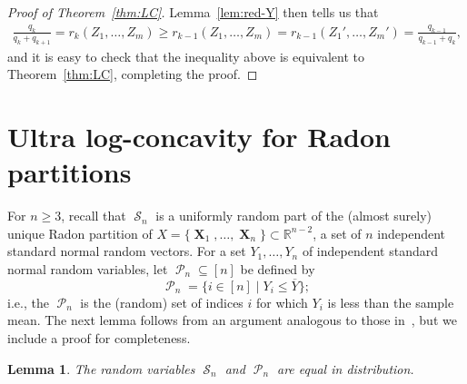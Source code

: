 \documentclass[12pt,english,reqno]{amsart}
\theoremstyle{plain}
\newtheorem{lemma}[thm]{Lemma}
\theoremstyle{remark}
\numberwithin{figure}{section}
\numberwithin{equation}{section}
\def\rr{\mathbb{R}}
\def\bY{\overline{Y}}
\DeclareMathOperator{\cP}{\mathcal{P}} %
\DeclareMathOperator{\cS}{\mathcal{S}} %
\DeclareMathOperator{\Xb}{\mathbf{X}} %
\def\aq{q} %
\def\ar{r} %
\begin{document}
\begin{proof}[Proof of Theorem~\ref{thm:LC}]
	Lemma~\ref{lem:red-Y} then tells us that
	\begin{align*}
		\frac{\aq_k}{\aq_{k} + \aq_{k+1}} = \ar_k(Z_1,\dots, Z_m) \ge \ar_{k-1}(Z_1,\dots, Z_m) = \ar_{k-1}(Z_1',\dots, Z_m') = \frac{\aq_{k-1}}{\aq_{k-1} + \aq_{k}},
	\end{align*}
	and it is easy to check that the inequality above is equivalent to Theorem~\ref{thm:LC}, completing the proof.
\end{proof}

\section{Ultra log-concavity for Radon partitions}\label{sec:proof-ULC}
For $n \ge 3$, recall that $\cS_n$ is a uniformly random part of the (almost surely) unique Radon partition of $X = \{\Xb_1,\dots, \Xb_{n}\} \subset \rr^{n-2}$, a set of $n$ independent standard normal random vectors. For a set $Y_1,\dots, Y_n$ of independent standard normal random variables, let $\cP_n \subseteq [n]$ be defined by
\[\cP_n = \{ i \in [n] \mid Y_i \leq \bY \}; \]
i.e., the $\cP_n$ is the (random) set of indices $i$ for which $Y_i$ is less than the sample mean. The next lemma follows from an argument analogous to those in~\citep{BV97,FNP25}, but we include a proof for completeness.

\begin{lemma}\label{lem:iso}
	The random variables $\cS_n$ 	and $\cP_n$ are equal in distribution.
\end{lemma}
\end{document}
